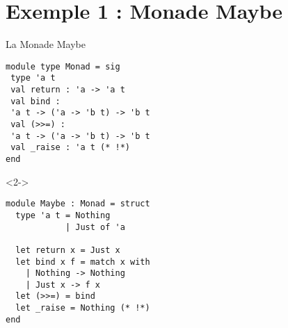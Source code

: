 \documentclass[10pt]{beamer}
\begin{document}
\section{Exemple 1 : Monade Maybe}
\begin{frame}[fragile]{La Monade Maybe}
  \begin{minipage}[c]{0.45\linewidth}
    \begin{verbatim}
module type Monad = sig
 type 'a t
 val return : 'a -> 'a t
 val bind :
 'a t -> ('a -> 'b t) -> 'b t
 val (>>=) :
 'a t -> ('a -> 'b t) -> 'b t
 val _raise : 'a t (* !*)
end
    \end{verbatim}
  \end{minipage}
  \hfill
  \begin{minipage}[c]{0.45\linewidth}
  \begin{onlyenv}<2->
    \begin{verbatim}
module Maybe : Monad = struct
  type 'a t = Nothing
            | Just of 'a

  let return x = Just x
  let bind x f = match x with
    | Nothing -> Nothing
    | Just x -> f x
  let (>>=) = bind
  let _raise = Nothing (* !*)
end
    \end{verbatim}
    \end{onlyenv}
  \end{minipage}
\end{frame}
\end{document}
